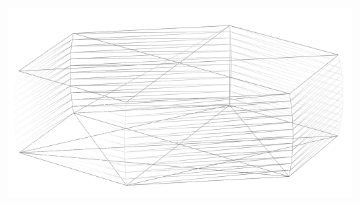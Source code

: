 \begin{figure}
\begin{center}
\begin{subfigure}{0.2\textwidth}
    \caption{}
    \end{subfigure}
    \begin{subfigure}{0.2\textwidth}
    \includegraphics[width=\linewidth]{assets/images/shapes/bugold/scale_low_w}
    \caption{}
    \end{subfigure}
  \end{center}
  \caption{}
  \label{fig:uneven_mesh_old}
\end{figure}
